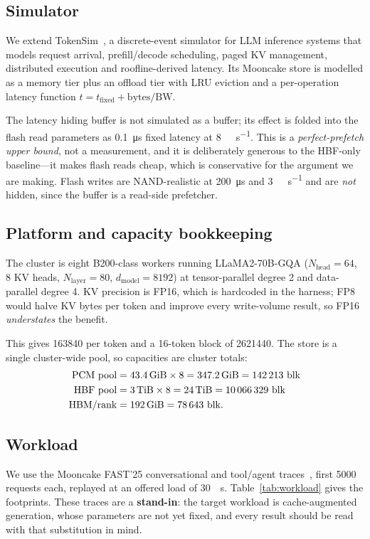\documentclass[conference]{IEEEtran}
\begin{document}
\subsection{Simulator}
We extend TokenSim~\cite{tokensim}, a discrete-event simulator for LLM inference
systems that models request arrival, prefill/decode scheduling, paged KV
management, distributed execution and roofline-derived latency. Its Mooncake
store is modelled as a memory tier plus an offload tier with LRU eviction and a
per-operation latency function
$t = t_\text{fixed} + \text{bytes} / \text{BW}$.

The latency hiding buffer is not simulated as a buffer; its effect is folded
into the flash read parameters as \SI{0.1}{\micro\second} fixed latency at
\SI{8}{\tera\byte\per\second}. This is a \emph{perfect-prefetch upper bound},
not a measurement, and it is deliberately generous to the HBF-only baseline---it
makes flash reads cheap, which is conservative for the argument we are making.
Flash writes are NAND-realistic at \SI{200}{\micro\second} and
\SI{3}{\giga\byte\per\second} and are \emph{not} hidden, since the buffer is a
read-side prefetcher.

\subsection{Platform and capacity bookkeeping}
The cluster is eight B200-class workers running LLaMA2-70B-GQA
($N_\text{head}=64$, 8 KV heads, $N_\text{layer}=80$, $d_\text{model}=8192$) at
tensor-parallel degree 2 and data-parallel degree 4. KV precision is FP16, which
is hardcoded in the harness; FP8 would halve KV bytes per token and improve every
write-volume result, so FP16 \emph{understates} the benefit.

This gives \SI{163840}{\byte} per token and a \num{16}-token block of
\SI{2621440}{\byte}. The store is a single cluster-wide pool, so capacities are
cluster totals:
\begin{align}
\text{PCM pool} &= \SI{43.4}{\gibi\byte} \times 8 = \SI{347.2}{\gibi\byte} = \num{142213}~\text{blk} \nonumber\\
\text{HBF pool} &= \SI{3}{\tebi\byte} \times 8 = \SI{24}{\tebi\byte} = \num{10066329}~\text{blk} \nonumber\\
\text{HBM/rank} &= \SI{192}{\gibi\byte} = \num{78643}~\text{blk.} \nonumber
\end{align}

\subsection{Workload}
We use the Mooncake FAST'25 conversational and tool/agent
traces~\cite{mooncake}, first \num{5000} requests each, replayed at an offered
load of \SI{30}{\per\second}. Table~\ref{tab:workload} gives the footprints.
These traces are a \textbf{stand-in}: the target workload is cache-augmented
generation, whose parameters are not yet fixed, and every result should be read
with that substitution in mind.
\end{document}
